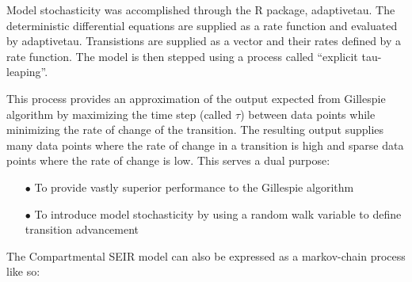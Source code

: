 \documentclass[../Paper.tex]{subfiles}
\begin{document}
\justifying
Model stochasticity was accomplished through the R package, adaptivetau.
The deterministic differential equations are supplied as a rate function and evaluated
by adaptivetau. Transistions are supplied as a vector and their rates defined by
a rate function. The model is then stepped using a process called
``explicit tau-leaping''\cite{yang_gillespie_petzold_2007}.

This process provides an approximation of the output expected from Gillespie algorithm by maximizing
the time step (called $\tau$) between data points while minimizing the rate of change
of the transition. The resulting output supplies many data points where the rate of
change in a transition is high and sparse data points where the rate
of change is low. This serves a dual purpose:

\begin{enumerate}
  \item[$\bullet$]{To provide vastly superior performance to the Gillespie algorithm}
  \item[$\bullet$]{To introduce model stochasticity by using a random walk variable
                   to define transition advancement}
\end{enumerate}

The Compartmental SEIR model can also be expressed as a markov-chain process like so:
\end{document}
